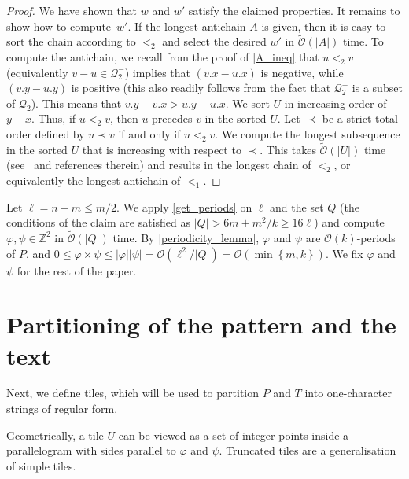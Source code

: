 \documentclass[twoside,leqno]{article}
\let\Cref\cref
\newcommand{\Z}{\mathbb{Z}}
\renewcommand{\O}{\mathcal{O}}
\newcommand{\tO}{\tilde{\mathcal{O}}}
\newcommand{\Q}{\mathcal{Q}}
\renewcommand{\phi}{\varphi}
\newcommand{\set}[1]{\left\lbrace #1 \right\rbrace}
\newcommand{\absolute}[1]{\left\lvert#1\right\rvert}
\newcommand{\jonas}[2][]{\todo[color=green!40, #1]{\textbf{J:} #2}}
\newcommand{\jonasi}[2][]{\jonas[inline, #1]{#2}}
\begin{document}
\begin{proof}
We have shown that $w$ and $w'$ satisfy the claimed properties. 
It remains to show how to compute~$w'$. 
If the longest antichain $A$ is given, then it is easy to sort the chain according to $<_2$ and select the desired $w'$ in $\tO(\absolute{A})$ time. To compute the antichain, we recall from the proof of \cref{A_ineq} that $u <_2 v$ (equivalently $v - u \in \Q_2^-$) implies that $(v.x - u.x)$ is negative, while $(v.y - u.y)$ is positive (this also readily follows from the fact that $\Q_2^-$ is a subset of $\Q_2$). This means that $v.y - v.x > u.y - u.x$. We sort $U$ in increasing order of $y - x$. Thus, if $u <_2 v$, then $u$ precedes $v$ in the sorted $U$. 
Let $\prec$ be a strict total order defined by $u \prec v$ if and only if $u <_2 v$. We compute the longest subsequence in the sorted $U$ that is increasing with respect to $\prec$. This takes $\tO(\absolute{U})$ time (see~\cite{CROCHEMORE20101054} and references therein) and results in the longest chain of $<_2$, or equivalently the longest antichain of $<_1$.
\end{proof}

Let $\ell = n - m \le m / 2$. We apply \Cref{get_periods} on $\ell$ and the set $Q$ (the conditions of the claim are satisfied as $\absolute{Q} > 6m + m^2/k \ge 16\ell$) and compute $\phi, \psi \in \Z^2$ in $\tO(\absolute{Q})$ time. By \Cref{periodicity_lemma}, $\phi$ and $\psi$ are $\O(k)$-periods of $P$, and $0 \le \phi \times \psi \le \absolute{\phi}\absolute{\psi} = \O(\ell^2 / \absolute{Q}) =  \O(\min\set{m, k})$. We fix $\phi$ and $\psi$ for the rest of the paper.


\section{Partitioning of the pattern and the text}
\label{sec:partition}



\jonasi{below}

Next, we define tiles, which will be used to partition $P$ and $T$ into one-character strings of regular form.

\restateDefLatticeCongruency

\restateDefTile

Geometrically, a tile $U$ can be viewed as a set of integer points inside a parallelogram with sides parallel to $\phi$ and $\psi$. Truncated tiles are a generalisation of simple tiles. 
\end{document}
